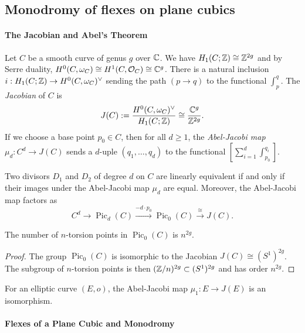 \documentclass[11pt]{amsart}
\begin{document}
\subsection{Monodromy of flexes on plane cubics}

\paragraph{\textbf{The Jacobian and Abel's Theorem}}

Let $C$ be a smooth curve of genus $g$ over $\mathbb{C}$. We have $H_1(C;\mathbb{Z}) \cong \mathbb{Z}^{2g}$ and by Serre duality, $H^0(C, \omega_C) \cong H^1(C, \mathcal{O}_C) \cong \mathbb{C}^g$. There is a natural inclusion $i: H_1(C;\mathbb{Z}) \to H^0(C, \omega_C)^\vee$ sending the path $(p\to q)$ to the functional $\int_p^q$. The \textit{Jacobian} of $C$ is $$J(C):= \frac{H^0(C, \omega_C)^\vee}{H_1(C; \mathbb{Z})} \cong \frac{\mathbb{C}^g}{\mathbb{Z}^{2g}}.$$
If we choose a base point $p_0\in C$, then for all $d\geq 1$, the \textit{Abel-Jacobi map} $\mu_d: C^d\to J(C)$ sends a $d$-uple $(q_1, \dots, q_d)$ to the functional $\left[\sum_{i = 1}^d \int_{p_0}^{q_i}\right]$.
\begin{theorem}
    Two divisors $D_1$ and $D_2$ of degree $d$ on $C$ are linearly equivalent if and only if their images under the Abel-Jacobi map $\mu_d$ are equal. Moreover, the Abel-Jacobi map factors as $$C^d\to \operatorname{Pic}_d(C)\overset{-d\cdot p_0}{\longrightarrow} \operatorname{Pic}_0(C) \overset{\cong}{\to} J(C).$$
\end{theorem}
\begin{corollary} \label{cor: n torsion in J(C)}
    The number of $n$-torsion points in $\operatorname{Pic}_0(C)$ is $n^{2g}$.
\end{corollary}

\begin{proof}
    The group $\operatorname{Pic}_0(C)$ is isomorphic to the Jacobian $J(C)\cong (S^1)^{2g}$. The subgroup of $n$-torsion points is then $(\mathbb{Z}/n)^{2g} \subset (S^1)^{2g}$ and has order $n^{2g}$.
\end{proof}

\begin{proposition}
    For an elliptic curve $(E, o)$, the Abel-Jacobi map $\mu_1: E \to J(E)$ is an isomorphism. 
\end{proposition}

\paragraph{\textbf{Flexes of a Plane Cubic and Monodromy}}
\end{document}
